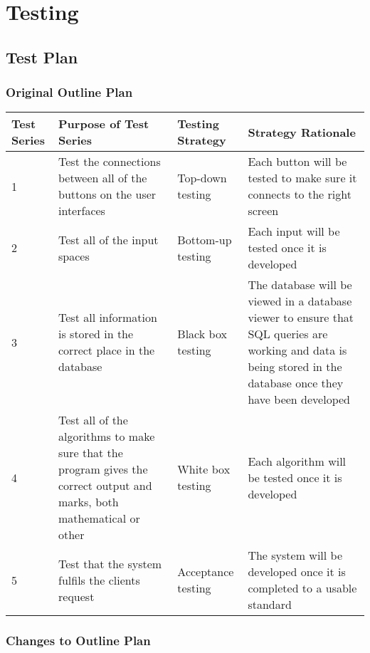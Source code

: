 \chapter{Testing}

\section{Test Plan}

\begin{landscape}
\subsection{Original Outline Plan}

\begin{center}
    \begin{longtable}{|p{2cm}|p{5cm}|p{5cm}|p{4cm}|}
        \hline
        \textbf{Test Series} & \textbf{Purpose of Test Series} & \textbf{Testing Strategy} & \textbf{Strategy Rationale}\\ \hline
        1 & Test the connections between all of the buttons on the user interfaces & Top-down testing & Each button will be tested to make sure it connects to the right screen \\ \hline
        2 & Test all of the input spaces & Bottom-up testing & Each input will be tested once it is developed \\ \hline
        3 & Test all information is stored in the correct place in the database & Black box testing & The database will be viewed in a database viewer to ensure that SQL queries are working and data is being stored in the database once they have been developed \\ \hline
	4 & Test all of the algorithms to make sure that the program gives the correct output and marks, both mathematical or other & White box testing & Each algorithm will be tested once it is developed \\ \hline
	5 & Test that the system fulfils the clients request & Acceptance testing & The system will be developed once it is completed to a usable standard \\ \hline
    \end{longtable}
\end{center}

\subsection{Changes to Outline Plan}


\end{landscape}

